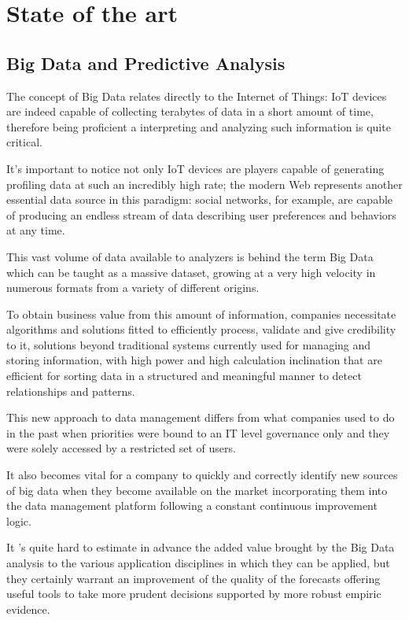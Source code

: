 \chead{}
\chapter{State of the art}

\section{Big Data and Predictive Analysis}

The concept of Big Data relates directly to the Internet of Things: IoT devices are indeed capable of collecting terabytes of data in a short amount of time, therefore being proficient a interpreting and analyzing such information is quite critical.

It's important to notice not only IoT devices are players capable of generating profiling data at such an incredibly high rate;  the modern Web represents another essential data source in this paradigm: social networks, for example, are capable of producing an endless stream of data describing user preferences and behaviors at any time.

This vast volume of data available to analyzers is behind the term Big Data which can be taught as a massive dataset, growing at a very high velocity in numerous formats from a variety of different origins.

To obtain business value from this amount of information, companies necessitate algorithms and solutions fitted to efficiently process, validate and give credibility to it, solutions beyond traditional systems currently used for managing and storing information, with high power and high calculation inclination that are efficient for sorting data in a structured and meaningful manner to detect relationships and patterns.

This new approach to data management differs from what companies used to do in the past when priorities were bound to an IT level governance only and they were solely accessed by a restricted set of users. 

It also becomes vital for a company to quickly and correctly identify new sources of big data when they become available on the market incorporating them into the data management platform following a constant continuous improvement logic.

It 's quite hard to estimate in advance the added value brought by the Big Data analysis to the various application disciplines in which they can be applied, but they certainly warrant an improvement of the quality of the forecasts offering useful tools to take more prudent decisions supported by more robust empiric evidence.

